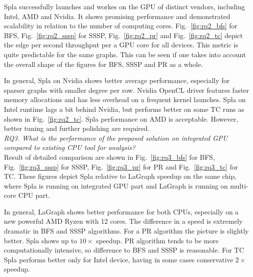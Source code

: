 Spla successfully launches and workes on the GPU of distinct vendors, including Intel, AMD and Nvidia. It shows promising performance and demonstrated scalability in relation to the number of computing cores. Fig.~\ref{fig:rq2_bfs} for BFS, Fig.~\ref{fig:rq2_sssp} for SSSP, Fig.~\ref{fig:rq2_pr} and Fig.~\ref{fig:rq2_tc} depict the edge per second throughput per a GPU core for all devices. This metric is quite predictable for the same graphs. This can be seen if one takes into account the overall shape of the figures for BFS, SSSP and PR as a whole.

In general, Spla on Nvidia shows better average performance, especially for sparser graphs with smaller degree per row. Nvidia OpenCL driver features faster memory allocations and has less overhead on a frequent kernel launches. Spla on Intel runtime lags a bit behind Nvidia, but performs better on some TC runs as shown in Fig.~\ref{fig:rq2_tc}. Spla performance on AMD is acceptable. However, better tuning and further polishing are required.\\

\textit{RQ3. What is the performance of the proposed solution on integrated GPU compared to existing CPU tool for analysis?}\\

Result of detailed comparison are shown in Fig.~\ref{fig:rq3_bfs} for BFS, Fig.~\ref{fig:rq3_sssp} for SSSP, Fig.~\ref{fig:rq3_pr} for PR and Fig.~\ref{fig:rq3_tc} for TC. These figures depict Spla relative to LaGraph speedup on the same chip, where Spla is running on integrated GPU part and LaGraph is running on multi-core CPU part. 

In general, LaGraph shows better performance for both CPUs, especially on a new powerful AMD Ryzen with 12 cores. The difference in a speed is extremely dramatic in BFS and SSSP algorithms. For a PR algorithm the picture is slightly better. Spla shows up to $10\times$ speedup. PR algorithm tends to be more computationally intensive, so difference to BFS and SSSP is reasonable. For TC Spla performs better only for Intel device, having in some cases conservative $2\times$ speedup. 



